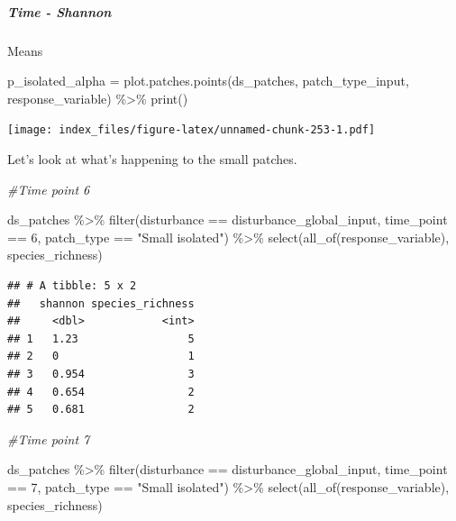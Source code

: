 \documentclass[
]{article}
\newenvironment{Shaded}{\begin{snugshade}}{\end{snugshade}}
\newcommand{\CommentTok}[1]{\textcolor[rgb]{0.56,0.35,0.01}{\textit{#1}}}
\newcommand{\DecValTok}[1]{\textcolor[rgb]{0.00,0.00,0.81}{#1}}
\newcommand{\FunctionTok}[1]{\textcolor[rgb]{0.00,0.00,0.00}{#1}}
\newcommand{\NormalTok}[1]{#1}
\newcommand{\OtherTok}[1]{\textcolor[rgb]{0.56,0.35,0.01}{#1}}
\newcommand{\SpecialCharTok}[1]{\textcolor[rgb]{0.00,0.00,0.00}{#1}}
\newcommand{\StringTok}[1]{\textcolor[rgb]{0.31,0.60,0.02}{#1}}
\begin{document}
\hypertarget{time---shannon}{%
\subparagraph{Time - Shannon}\label{time---shannon}}

Means

\begin{Shaded}
\begin{Highlighting}[]
\NormalTok{p\_isolated\_alpha }\OtherTok{=} \FunctionTok{plot.patches.points}\NormalTok{(ds\_patches, patch\_type\_input,}
\NormalTok{                       response\_variable) }\SpecialCharTok{\%\textgreater{}\%}
  \FunctionTok{print}\NormalTok{()}
\end{Highlighting}
\end{Shaded}

\texttt{[image: index\_files/figure-latex/unnamed-chunk-253-1.pdf]}

Let's look at what's happening to the small patches.

\begin{Shaded}
\begin{Highlighting}[]
\CommentTok{\#Time point 6}

\NormalTok{ds\_patches }\SpecialCharTok{\%\textgreater{}\%}
  \FunctionTok{filter}\NormalTok{(disturbance }\SpecialCharTok{==}\NormalTok{ disturbance\_global\_input,}
\NormalTok{         time\_point }\SpecialCharTok{==} \DecValTok{6}\NormalTok{,}
\NormalTok{         patch\_type }\SpecialCharTok{==} \StringTok{"Small isolated"}\NormalTok{) }\SpecialCharTok{\%\textgreater{}\%}
  \FunctionTok{select}\NormalTok{(}\FunctionTok{all\_of}\NormalTok{(response\_variable),}
\NormalTok{         species\_richness)}
\end{Highlighting}
\end{Shaded}

\begin{verbatim}
## # A tibble: 5 x 2
##   shannon species_richness
##     <dbl>            <int>
## 1   1.23                 5
## 2   0                    1
## 3   0.954                3
## 4   0.654                2
## 5   0.681                2
\end{verbatim}

\begin{Shaded}
\begin{Highlighting}[]
\CommentTok{\#Time point 7}

\NormalTok{ds\_patches }\SpecialCharTok{\%\textgreater{}\%}
  \FunctionTok{filter}\NormalTok{(disturbance }\SpecialCharTok{==}\NormalTok{ disturbance\_global\_input,}
\NormalTok{         time\_point }\SpecialCharTok{==} \DecValTok{7}\NormalTok{,}
\NormalTok{         patch\_type }\SpecialCharTok{==} \StringTok{"Small isolated"}\NormalTok{) }\SpecialCharTok{\%\textgreater{}\%}
  \FunctionTok{select}\NormalTok{(}\FunctionTok{all\_of}\NormalTok{(response\_variable),}
\NormalTok{         species\_richness)}
\end{Highlighting}
\end{Shaded}
\end{document}
